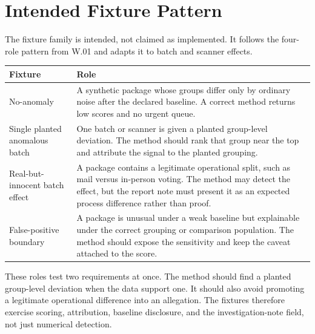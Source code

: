 \section{Intended Fixture Pattern}

The fixture family is intended, not claimed as implemented. It follows the
four-role pattern from W.01 and adapts it to batch and scanner effects.

\begin{center}
\small
\begin{tabularx}{\textwidth}{lX}
\toprule
Fixture & Role \\
\midrule
No-anomaly & A synthetic package whose groups differ only by ordinary noise after the declared baseline. A correct method returns low scores and no urgent queue. \\
Single planted anomalous batch & One batch or scanner is given a planted group-level deviation. The method should rank that group near the top and attribute the signal to the planted grouping. \\
Real-but-innocent batch effect & A package contains a legitimate operational split, such as mail versus in-person voting. The method may detect the effect, but the report note must present it as an expected process difference rather than proof. \\
False-positive boundary & A package is unusual under a weak baseline but explainable under the correct grouping or comparison population. The method should expose the sensitivity and keep the caveat attached to the score. \\
\bottomrule
\end{tabularx}
\end{center}

These roles test two requirements at once. The method should find a planted
group-level deviation when the data support one. It should also avoid promoting
a legitimate operational difference into an allegation. The fixtures therefore
exercise scoring, attribution, baseline disclosure, and the investigation-note
field, not just numerical detection.

